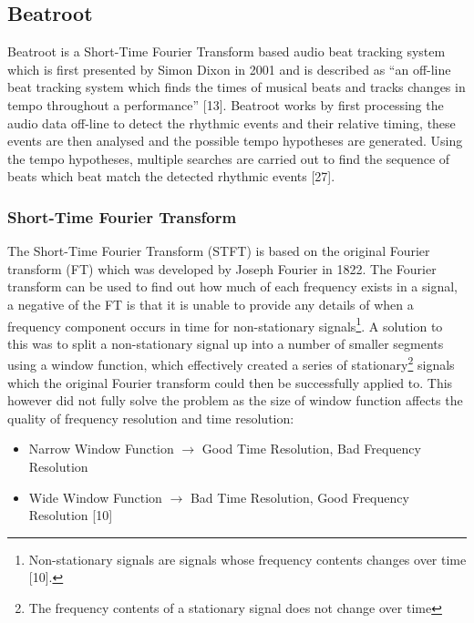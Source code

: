 \documentclass[a4paper, 11pt]{article}
\begin{document}
\subsection{Beatroot}
Beatroot is a Short-Time Fourier Transform based audio beat tracking system which is first presented by Simon Dixon in 2001 and is described as ``an off-line beat tracking system which finds the times of musical beats and tracks changes in tempo throughout a performance'' [13]. Beatroot works by first processing the audio data off-line to detect the rhythmic events and their relative timing, these events are then analysed and the possible tempo hypotheses are generated. Using the tempo hypotheses, multiple searches are carried out to find the sequence of beats which beat match the detected rhythmic events [27]. 



\subsubsection{Short-Time Fourier Transform}
The Short-Time Fourier Transform (STFT) is based on the original Fourier transform (FT) which was developed by Joseph Fourier in 1822. The Fourier transform can be used to find out how much of each frequency exists in a signal, a negative of the FT is that it is unable to provide any details of when a frequency component occurs in time for non-stationary signals\footnote{Non-stationary signals are signals whose frequency contents changes over time [10].}. A solution to this was to split a non-stationary signal up into a number of smaller segments using a window function, which effectively created a series of stationary\footnote{The frequency contents of a stationary signal does not change over time} signals which the original Fourier transform could then be successfully applied to. This however did not fully solve the problem as the size of window function affects the quality of frequency resolution and time resolution:
\begin{itemize}
\item Narrow Window Function $\longrightarrow$  Good Time Resolution, Bad Frequency Resolution
\item Wide Window Function $\longrightarrow$  Bad Time Resolution, Good Frequency Resolution [10]
\end{itemize}
\end{document}
